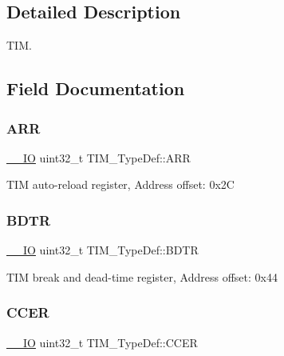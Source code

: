 \subsection{Detailed Description}
T\+IM. 

\subsection{Field Documentation}
\mbox{\label{struct_t_i_m___type_def_a6a42766a6ca3c7fe10a810ebd6b9d627}} 
\subsubsection{\texorpdfstring{A\+RR}{ARR}}
{\footnotesize\ttfamily \hyperlink{core__sc300_8h_aec43007d9998a0a0e01faede4133d6be}{\+\_\+\+\_\+\+IO} uint32\+\_\+t T\+I\+M\+\_\+\+Type\+Def\+::\+A\+RR}

T\+IM auto-\/reload register, Address offset\+: 0x2C \mbox{\label{struct_t_i_m___type_def_a137d3523b60951eca1e4130257b2b23d}} 
\subsubsection{\texorpdfstring{B\+D\+TR}{BDTR}}
{\footnotesize\ttfamily \hyperlink{core__sc300_8h_aec43007d9998a0a0e01faede4133d6be}{\+\_\+\+\_\+\+IO} uint32\+\_\+t T\+I\+M\+\_\+\+Type\+Def\+::\+B\+D\+TR}

T\+IM break and dead-\/time register, Address offset\+: 0x44 \mbox{\label{struct_t_i_m___type_def_ad7271cc1eec9ef16e4ee5401626c0b3b}} 
\subsubsection{\texorpdfstring{C\+C\+ER}{CCER}}
{\footnotesize\ttfamily \hyperlink{core__sc300_8h_aec43007d9998a0a0e01faede4133d6be}{\+\_\+\+\_\+\+IO} uint32\+\_\+t T\+I\+M\+\_\+\+Type\+Def\+::\+C\+C\+ER}

